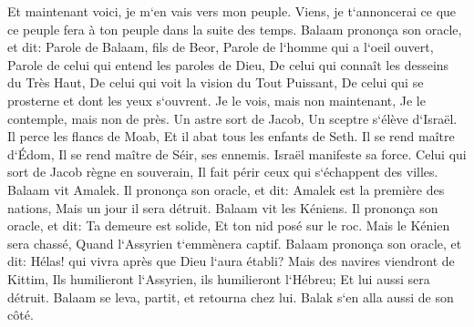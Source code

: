 \verse Et maintenant voici, je m`en vais vers mon peuple. Viens, je t`annoncerai ce que ce peuple fera à ton peuple dans la suite des temps. 
\verse Balaam prononça son oracle, et dit: Parole de Balaam, fils de Beor, Parole de l`homme qui a l`oeil ouvert, 
\verse Parole de celui qui entend les paroles de Dieu, De celui qui connaît les desseins du Très Haut, De celui qui voit la vision du Tout Puissant, De celui qui se prosterne et dont les yeux s`ouvrent. 
\verse Je le vois, mais non maintenant, Je le contemple, mais non de près. Un astre sort de Jacob, Un sceptre s`élève d`Israël. Il perce les flancs de Moab, Et il abat tous les enfants de Seth. 
\verse Il se rend maître d`Édom, Il se rend maître de Séir, ses ennemis. Israël manifeste sa force. 
\verse Celui qui sort de Jacob règne en souverain, Il fait périr ceux qui s`échappent des villes. 
\verse Balaam vit Amalek. Il prononça son oracle, et dit: Amalek est la première des nations, Mais un jour il sera détruit. 
\verse Balaam vit les Kéniens. Il prononça son oracle, et dit: Ta demeure est solide, Et ton nid posé sur le roc. 
\verse Mais le Kénien sera chassé, Quand l`Assyrien t`emmènera captif. 
\verse Balaam prononça son oracle, et dit: Hélas! qui vivra après que Dieu l`aura établi? 
\verse Mais des navires viendront de Kittim, Ils humilieront l`Assyrien, ils humilieront l`Hébreu; Et lui aussi sera détruit. 
\verse Balaam se leva, partit, et retourna chez lui. Balak s`en alla aussi de son côté. 

